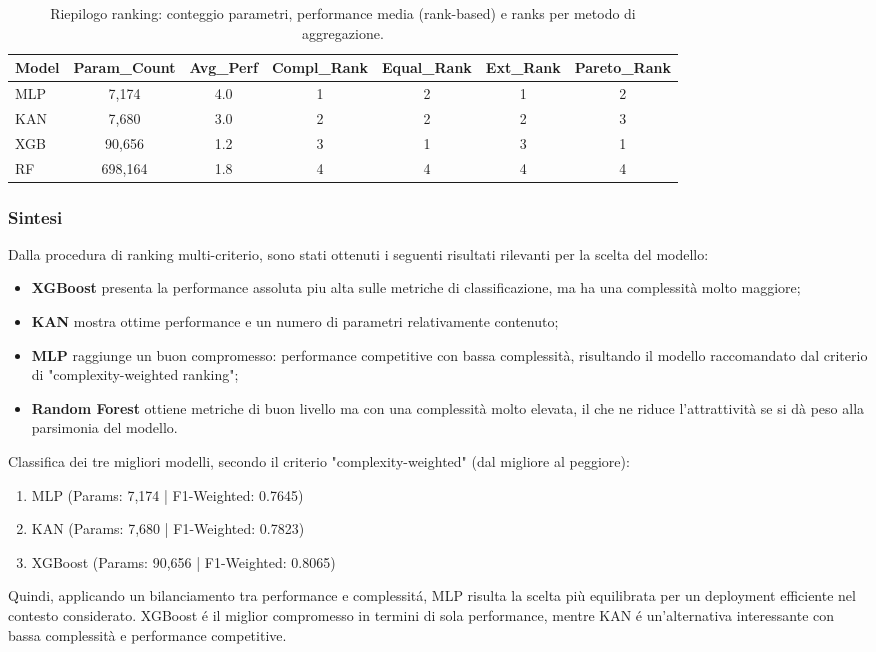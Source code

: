 \documentclass[a4paper,12pt]{report}
\begin{document}
	\begin{table}[H]
		\centering
		\setlength{\tabcolsep}{2pt}
		\begin{tabular}{lcccccc}
			\toprule
			\textbf{Model} & \textbf{Param\_Count} & \textbf{Avg\_Perf} & \textbf{Compl\_Rank} & \textbf{Equal\_Rank} & \textbf{Ext\_Rank} & \textbf{Pareto\_Rank} \\
			\midrule
			MLP           & 7,174   & 4.0 & 1 & 2 & 1 & 2 \\
			KAN           & 7,680   & 3.0 & 2 & 2 & 2 & 3 \\
			XGB           & 90,656  & 1.2 & 3 & 1 & 3 & 1 \\
			RF 			  & 698,164 & 1.8 & 4 & 4 & 4 & 4 \\
			\bottomrule
		\end{tabular}
		\caption{Riepilogo ranking: conteggio parametri, performance media (rank-based) e ranks per metodo di aggregazione.}
	\end{table}
	
	\subsubsection{Sintesi}
	Dalla procedura di ranking multi-criterio, sono stati ottenuti i seguenti risultati rilevanti per la scelta del modello:
	\begin{itemize}
		\item \textbf{XGBoost} presenta la performance assoluta piu alta sulle metriche di classificazione, ma ha una complessit\`a molto maggiore;
		\item \textbf{KAN} mostra ottime performance e un numero di parametri relativamente contenuto;
		\item \textbf{MLP} raggiunge un buon compromesso: performance competitive con bassa complessità, risultando il modello raccomandato dal criterio di "complexity-weighted ranking";
		\item \textbf{Random Forest} ottiene metriche di buon livello ma con una complessit\`a molto elevata, il che ne riduce l'attrattivit\`a se si dà peso alla parsimonia del modello.
	\end{itemize}
	Classifica dei tre migliori modelli, secondo il criterio "complexity-weighted" (dal migliore al peggiore):
	\begin{enumerate}
		\item MLP \quad (Params: 7,174 \;|\; F1-Weighted: 0.7645)
		\item KAN \quad (Params: 7,680 \;|\; F1-Weighted: 0.7823)
		\item XGBoost \quad (Params: 90,656 \;|\; F1-Weighted: 0.8065)
	\end{enumerate}
	Quindi, applicando un bilanciamento tra performance e complessitá, MLP risulta la scelta più equilibrata per un deployment efficiente nel contesto considerato. XGBoost é il miglior compromesso in termini di sola performance, mentre KAN é un'alternativa interessante con bassa complessità e performance competitive.
	
\end{document}
